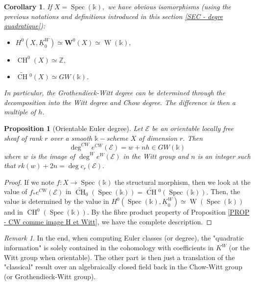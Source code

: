 \documentclass{amsart}
\theoremstyle{plain}%
\newtheorem{prop}[subsubsection]{Proposition}
\newtheorem{cor}[subsubsection]{Corollary}
\theoremstyle{remark}
\newtheorem{rmq}[subsubsection]{Remark}
\theoremstyle{definition}
\newcommand{\cE}{\mathcal{E}}
\newcommand{\ek}{\mathbb{k}}
\newcommand{\eZ}{\mathbb{Z}}
\newcommand{\bfW}{\mathbf{W}}
\newcommand{\GW}{GW}
\newcommand{\Witt}{\operatorname{W}}
\newcommand{\sKW}{\underline{K}^W}
\newcommand{\Chowtilde}[2][]{\widetilde{\operatorname{CH}}{}^{#1}\!\left(#2\right)}
\newcommand{\Chowtildecov}[2][]{\widetilde{\operatorname{CH}}_{#1}\left(#2\right)}
\newcommand{\Spec}[1]{\operatorname{Spec}\left(#1\right)}
\newcommand{\Chowct}[2][]{\operatorname{CH}^{#1}\!\left( #2 \right)}
\begin{document}




\begin{cor}\label{COR - groupe Chow-Witt corps}
If $X = \Spec{\ek},$ we have obvious isomorphisms (using the previous notations and definitions introduced in this section \ref{SEC - degre quadratique}):
\begin{itemize}
\item $H^0(X,\sKW_0) \simeq \bfW^0(X) \simeq \Witt(\ek),$
\item $\Chowct[0]{X} \simeq \eZ,$
\item $\Chowtilde[0]{X} \simeq \GW(\ek)$.
\end{itemize}
In particular, the Grothendieck-Witt degree can be determined through the decomposition into the Witt degree and Chow degree. The difference is then a multiple of $h$.
\end{cor}



\begin{prop}[Orientable Euler degree]\label{PROP - classe Euler orientable}
Let $\cE$ be an orientable locally free sheaf of rank $r$ over a smooth $\ek-$scheme $X$ of dimension $r$. Then 
\[\deg^{CW} e^{CW}(\cE) = w + n h \in \GW(\ek)\]
where $w$ is the image of $\deg^W e^W(\cE)$ in the Witt group and $n$ is an integer such that $rk(w) + 2n = \deg c_r(\cE).$

\end{prop}

\begin{proof}
If we note $f : X \to \Spec{\ek}$ the structural morphism, then we look at the value of $f_\ast e^{CW}(\cE)$ in $\Chowtildecov[0]{\Spec\ek} = \Chowtilde[0]{\Spec\ek}.$ Then, the value is determined by the value in $H^0(\Spec{\ek},\sKW_0) \simeq \Witt(\Spec{\ek})$ and in $\Chowct[0]{\Spec\ek}$. By the fibre product property of Proposition \ref{PROP - CW comme image H et Witt}, we have the complete description. 
\end{proof}

\begin{rmq}\label{RMQ - donnee Witt est la seule importante}
In the end, when computing Euler classes (or degree), the "quadratic information" is solely contained in the cohomology with coefficients in $K^W$ (or the Witt group when orientable). The other part is then just a translation of the "classical" result over an algebraically closed field back in the Chow-Witt group (or Grothendieck-Witt group).
\end{rmq}
\end{document}
